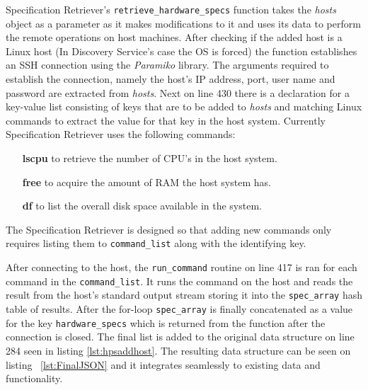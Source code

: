 

Specification Retriever's \verb|retrieve_hardware_specs| function takes the \textit{hosts} object as a parameter as it makes modifications to it and uses its data to perform the remote operations on host machines. After checking if the added host is a Linux host (In Discovery Service's case the OS is forced) the function establishes an SSH connection using the \textit{Paramiko} library\cite{paramiko}. The arguments required to establish the connection, namely the host's IP address, port, user name and password are extracted from \textit{hosts}. Next on line 430 there is a declaration for a key-value list consisting of keys that are to be added to \textit{hosts} and matching Linux commands to extract the value for that key in the host system. Currently Specification Retriever uses the following commands:

\begin{itemize}
\item[\textbf{lscpu}] to retrieve the number of CPU's in the host system.
\item[\textbf{free}] to acquire the amount of RAM the host system has.
\item[\textbf{df}] to list the overall disk space available in the system.
\end{itemize}

The Specification Retriever is designed so that adding new commands only requires listing them to \verb|command_list| along with the identifying key. 

After connecting to the host, the \verb|run_command| routine on line 417 is ran for each command in the \verb|command_list|. It runs the command on the host and reads the result from the host's standard output stream storing it into the \verb|spec_array| hash table of results. After the for-loop \verb|spec_array| is finally concatenated as a value for the key \verb|hardware_specs| which is returned from the function after the connection is closed. The final list is added to the original data structure on line 284 seen in listing \ref{lst:hpsaddhost}. The resulting data structure can be seen on listing ~\ref{lst:FinalJSON} and it integrates seamlessly to existing data and functionality.

